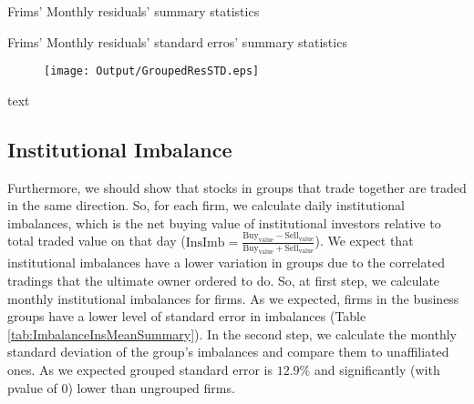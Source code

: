 {			\begin{table}[htbp]
	\centering
	\caption{Frims' Monthly residuals' summary statistics}
	\label{tab:ResidualTrunSummary}
	\resizebox{0.8\textwidth}{!}{
		
	}
\end{table}	
		\begin{table}[htbp]
			\centering
			\caption{Frims' Monthly residuals' standard erros' summary statistics}
			\label{tab:ResidualTrunStdSummary}
			\resizebox{0.8\textwidth}{!}{
				
			}
		\end{table}
\begin{figure}[htbp]
	\centering
	\texttt{[image: Output/GroupedResSTD.eps]}
	\label{fig:GroupedResSTD}
\end{figure}
		\begin{table}[htbp]
			\centering
			\caption{text}
			\label{Turnovercrosssection}
			\resizebox{\textwidth}{!}{
				\centering
				
			}			
		\end{table}}



\FloatBarrier





\subsection{{Institutional Imbalance}}

	Furthermore, we should show that stocks in groups that trade together are traded in the same direction. So, for each firm, we calculate daily institutional imbalances, which is the net buying value of institutional investors relative to total traded value on that day ($ \text{InsImb} = \frac{\text{Buy}_{\text{value}} - \text{Sell}_{\text{value}}}{\text{Buy}_{\text{value}} + \text{Sell}_{\text{value}}} $).\cite{seasholes2007predictable} 
	We expect that institutional imbalances have a lower variation in groups due to the correlated tradings that the ultimate owner ordered to do. So, at first step, we calculate monthly institutional imbalances for firms. As we expected, firms in the business groups have a lower level of standard error in  imbalances (Table \ref{tab:ImbalanceInsMeanSummary}). In the second step, 	 we calculate the monthly standard deviation of the group's imbalances and compare them to unaffiliated ones. As we expected grouped standard error is  $12.9\%$ and significantly (with pvalue of 0) lower than ungrouped firms. 
	
